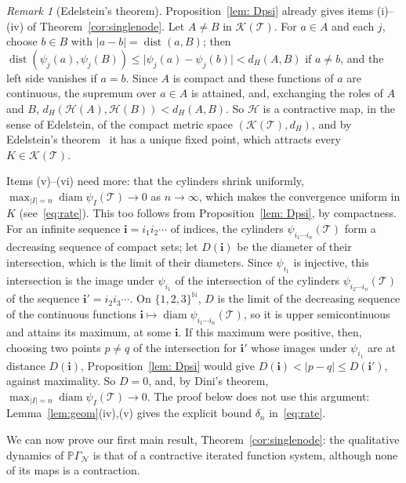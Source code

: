 \documentclass[11pt]{amsart}
\theoremstyle{definition}
\theoremstyle{remark}
\newtheorem{remark}[proposition]{Remark}
\newcommand{\N}{\mathbb N}
\newcommand{\cT}{\mathcal T}
\newcommand{\PGN}{{\mathbb P}\Gamma_{\mathcal N}}
\newcommand{\abs}[1]{\lvert #1\rvert}
\DeclareMathOperator{\diam}{diam}
\begin{document}
\begin{remark}[Edelstein's theorem]\label{rem:edelstein}
Proposition~\ref{lem: Dpsi} already gives items (i)--(iv) of Theorem~\ref{cor:singlenode}. Let $A\ne B$ in $\mathcal K(\cT)$. For $a\in A$ and each $j$, choose $b\in B$ with $\abs{a-b}=\operatorname{dist}(a,B)$; then $\operatorname{dist}(\psi_j(a),\psi_j(B))\le\abs{\psi_j(a)-\psi_j(b)}<d_H(A,B)$ if $a\ne b$, and the left side vanishes if $a=b$. Since $A$ is compact and these functions of $a$ are continuous, the supremum over $a\in A$ is attained, and, exchanging the roles of $A$ and $B$, $d_H(\mathcal H(A),\mathcal H(B))<d_H(A,B)$. So $\mathcal H$ is a contractive map, in the sense of Edelstein, of the compact metric space $(\mathcal K(\cT),d_H)$, and by Edelstein's theorem~\cite{Ede62} it has a unique fixed point, which attracts every $K\in\mathcal K(\cT)$.

Items (v)--(vi) need more: that the cylinders shrink uniformly, $\max_{\abs I=n}\diam\psi_I(\cT)\to0$ as $n\to\infty$, which makes the convergence uniform in $K$ (see~\eqref{eq:rate}). This too follows from Proposition~\ref{lem: Dpsi}, by compactness. For an infinite sequence $\mathbf i=i_1i_2\cdots$ of indices, the cylinders $\psi_{i_1\cdots i_n}(\cT)$ form a decreasing sequence of compact sets; let $D(\mathbf i)$ be the diameter of their intersection, which is the limit of their diameters. Since $\psi_{i_1}$ is injective, this intersection is the image under $\psi_{i_1}$ of the intersection of the cylinders $\psi_{i_2\cdots i_n}(\cT)$ of the sequence $\mathbf i'=i_2i_3\cdots$. On $\{1,2,3\}^{\N}$, $D$ is the limit of the decreasing sequence of the continuous functions $\mathbf i\mapsto\diam\psi_{i_1\cdots i_n}(\cT)$, so it is upper semicontinuous and attains its maximum, at some $\mathbf i$. If this maximum were positive, then, choosing two points $p\ne q$ of the intersection for $\mathbf i'$ whose images under $\psi_{i_1}$ are at distance $D(\mathbf i)$, Proposition~\ref{lem: Dpsi} would give $D(\mathbf i)<\abs{p-q}\le D(\mathbf i')$, against maximality. So $D=0$, and, by Dini's theorem, $\max_{\abs I=n}\diam\psi_I(\cT)\to0$. The proof below does not use this argument: Lemma~\ref{lem:geom}(iv),(v) gives the explicit bound $\delta_n$ in~\eqref{eq:rate}.
\end{remark}

\medskip
We can now prove our first main result, Theorem~\ref{cor:singlenode}: the qualitative dynamics of $\PGN$ is that of a contractive iterated function system, although none of its maps is a contraction.
\end{document}
